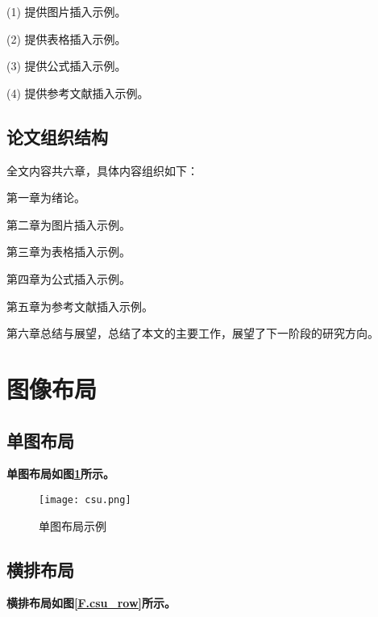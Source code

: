 (1) 提供图片插入示例。

(2) 提供表格插入示例。

(3) 提供公式插入示例。

(4) 提供参考文献插入示例。

\subsection{论文组织结构}

全文内容共六章，具体内容组织如下：

第一章为绪论。

第二章为图片插入示例。

第三章为表格插入示例。

第四章为公式插入示例。

第五章为参考文献插入示例。

第六章总结与展望，总结了本文的主要工作，展望了下一阶段的研究方向。

\newpage

\section{图像布局}


\subsection{单图布局}



\textbf{单图布局如图\ref{F.csu_single}所示。}

\begin{figure}[hbt]
\centering
\texttt{[image: csu.png]}
\caption{单图布局示例}
\label{F.csu_single}
\end{figure}

\subsection{横排布局}

\textbf{横排布局如图\ref{F.csu_row}所示。}

